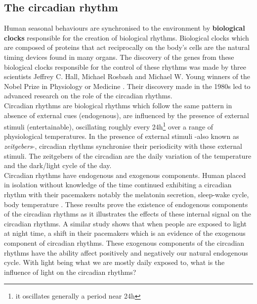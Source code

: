 \subsection{The circadian rhythm}
Human seasonal behaviours are synchronised to the environment by \textbf{biological clocks} responsible for the creation of biological rhythms. Biological clocks which are composed of proteins that act reciprocally on the body's cells are the natural timing devices found in many organs. The discovery of the genes from these biological clocks responsible for the control of these rhythms was made by three scientists Jeffrey  C.  Hall,  Michael  Rosbash and Michael W. Young winners of the Nobel Prize in Physiology or Medicine \cite{sc2017}. Their discovery made in the 1980s led to advanced research on the role of the circadian rhythms.\\
Circadian rhythms are biological rhythms which follow the same pattern in absence of external cues (endogenous), are influenced by the presence of external stimuli (entertainable), oscillating roughly every 24h\footnote{it oscillates generally a period near 24h} over a range of physiological temperatures. In the presence of external stimuli -also known as \textit{zeitgebers}-, circadian rhythms synchronise their periodicity with these external stimuli. The zeitgebers of the circadian are the daily variation of the temperature and the dark/light cycle of the day.\\
Circadian rhythms have endogenous and exogenous components. Human placed in isolation without knowledge of the time continued exhibiting a circadian rhythm with their pacemakers notably the melatonin secretion, sleep-wake cycle, body temperature \cite{in1996}. These results prove the existence of endogenous components of the circadian rhythms as it illustrates the effects of these internal signal on the circadian rhythms. A similar study shows that when people are exposed to light at night time, a shift in their pacemakers \cite{ea2004} which is an evidence of the exogenous component of circadian rhythms. These exogenous components of the circadian rhythms have the ability affect positively and negatively our natural endogenous cycle. With light being what we are mostly daily exposed to, what is the influence of light on the circadian rhythms? 

